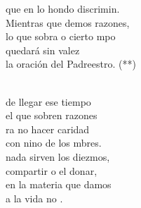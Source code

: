 \begin{cancion}
	que en lo hondo discrimin.\\
Mientras que demos razones, \\
	lo que sobra o cierto mpo\\
	quedará sin valez \\
	la oración del Padreestro. (**)\\\jump\\
	\begin{chorus}%
	de llegar ese tiempo \\
	el que sobren razones\\
	ra no hacer caridad \\
	con nino de los mbres.\\
	nada sirven los diezmos,\\
	compartir o el donar,\\
	 en la materia que damos\\
	a la vida no .   \\
	\end{chorus}%
	\jump\\
\end{cancion}%
